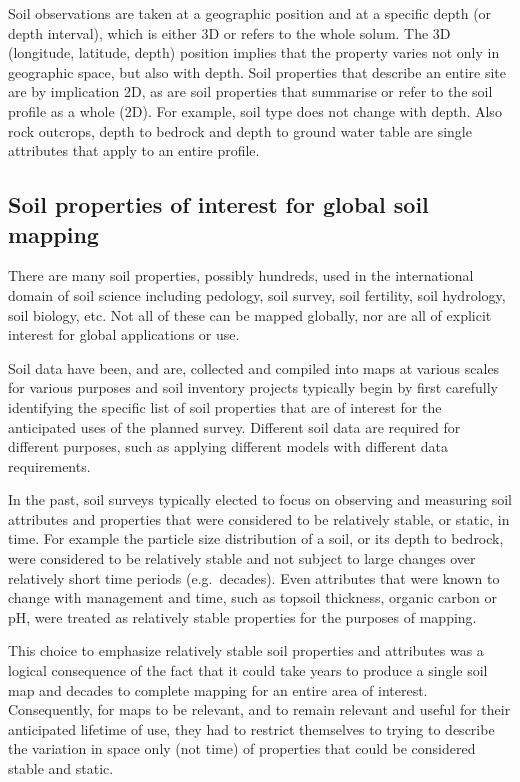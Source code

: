 \documentclass[graybox,natbib,nospthms,UStrade]{svmono}
\begin{document}
Soil observations are taken at a geographic position and at a specific
depth (or depth interval), which is either 3D or refers to the whole solum. The 3D
(longitude, latitude, depth) position implies that the property varies
not only in geographic space, but also with depth. Soil properties that
describe an entire site are by implication 2D, as are soil properties
that summarise or refer to the soil profile as a whole (2D). For
example, soil type does not change with depth. Also rock outcrops, depth
to bedrock and depth to ground water table are single attributes that apply to an entire profile.

\hypertarget{soil-properties-of-interest-for-global-soil-mapping}{%
\subsection{Soil properties of interest for global soil mapping}\label{soil-properties-of-interest-for-global-soil-mapping}}

There are many soil properties, possibly hundreds, used in the
international domain of soil science including pedology, soil survey,
soil fertility, soil hydrology, soil biology, etc. Not all of these can
be mapped globally, nor are all of explicit interest for global
applications or use.

Soil data have been, and are, collected and
compiled into maps at various scales for various purposes and soil
inventory projects typically begin by first carefully identifying the
specific list of soil properties that are of interest for the
anticipated uses of the planned survey. Different soil data are required
for different purposes, such as applying different models with different
data requirements.

In the past, soil surveys typically elected to focus on observing
and measuring soil attributes and properties that were considered
to be relatively stable, or static, in time. For example the particle
size distribution of a soil, or its depth to bedrock, were considered
to be relatively stable and not subject to large changes over relatively
short time periods (e.g.~decades). Even attributes that were known to
change with management and time, such as topsoil thickness, organic carbon
or pH, were treated as relatively stable properties for the purposes of
mapping.

This choice to emphasize relatively stable soil properties and
attributes was a logical consequence of the fact that it could take years
to produce a single soil map and decades to complete mapping for an entire
area of interest. Consequently, for maps to be relevant, and to remain
relevant and useful for their anticipated lifetime of use, they had to
restrict themselves to trying to describe the variation in space only (not time)
of properties that could be considered stable and static.
\end{document}
